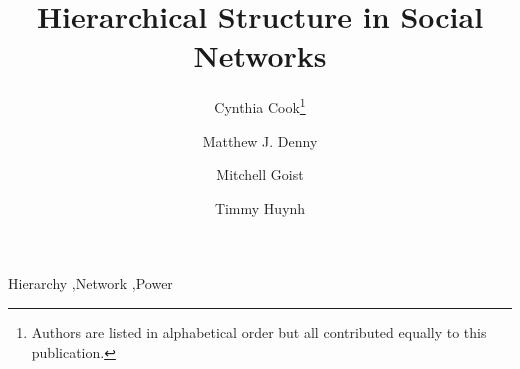 \documentclass[3p,times]{elsarticle}
\begin{document}
\begin{frontmatter}




\title{Hierarchical Structure in Social Networks}


\author[au1]{Cynthia Cook\footnote{Authors are listed in alphabetical order but all contributed equally to this publication.}} 
\author[au2]{Matthew J. Denny}
\author[au3]{Mitchell Goist} 
\author[au4]{Timmy Huynh}

\address[au1]{Department of Statistics cmc496@psu.edu}
\address[au2]{Department of Political Science, mdenny@psu.edu}
\address[au3]{Department of Political Science mlg307@psu.edu}
\address[au4]{Department of Sociology and Criminology, tnh133@psu.edu}

\begin{abstract}

\end{abstract}

\begin{keyword}
Hierarchy \sep Network \sep Power


\end{keyword}

\end{frontmatter}

\end{document}
